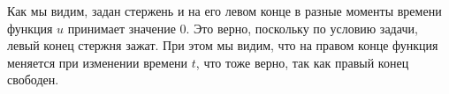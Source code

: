 Как мы видим, задан стержень и на его левом конце в разные моменты времени функция $u$ принимает значение 0. Это верно, поскольку по условию задачи, левый конец стержня зажат. При этом мы видим, что на правом конце функция меняется при изменении времени $t$, что тоже верно, так как правый конец свободен.

\pagebreak